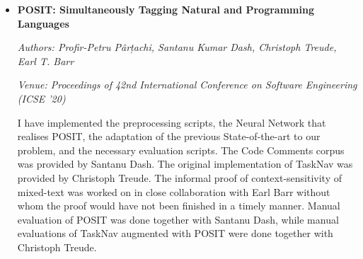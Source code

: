 \begin{itemize}[leftmargin=*]
    \pagebreak
    
    \item[] \noindent\textbf{POSIT: Simultaneously Tagging Natural and
    Programming Languages} 
    
    \noindent\emph{Authors: Profir-Petru Pârțachi, Santanu Kumar Dash, Christoph
    Treude, Earl T. Barr}
    
    \noindent\emph{Venue: Proceedings of 42nd International Conference on
    Software Engineering (ICSE ’20)}

    \noindent I have implemented the preprocessing scripts, the Neural Network
    that realises POSIT, the adaptation of the previous State-of-the-art to our
    problem, and the necessary evaluation scripts. The Code Comments corpus was
    provided by Santanu Dash. The original implementation of TaskNav was
    provided by Christoph Treude. The informal proof of context-sensitivity of
    mixed-text was worked on in close collaboration with Earl Barr without whom
    the proof would have not been finished in a timely manner. Manual evaluation
    of POSIT was done together with Santanu Dash, while manual evaluations of
    TaskNav augmented with POSIT were done together with Christoph Treude.

\end{itemize}

